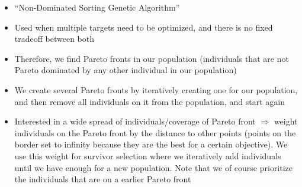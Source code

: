 \begin{itemize}
\begin{itemize}
\begin{itemize}
			\item ``Non-Dominated Sorting Genetic Algorithm''
			\item Used when multiple targets need to be optimized, and there is no fixed tradeoff between both 
			\item Therefore, we find Pareto fronts in our population (individuals that are not Pareto dominated by any other individual in our population)
			\item We create several Pareto fronts by iteratively creating one for our population, and then remove all individuals on it from the population, and start again
			\item Interested in a wide spread of individuals/coverage of Pareto front $\Rightarrow$ weight individuals on the Pareto front by the distance to other points (points on the border set to infinity because they are the best for a certain objective). We use this weight for survivor selection where we iteratively add individuals until we have enough for a new population. Note that we of course prioritize the individuals that are on a earlier Pareto front
		\end{itemize}
	\end{itemize}
\end{itemize}